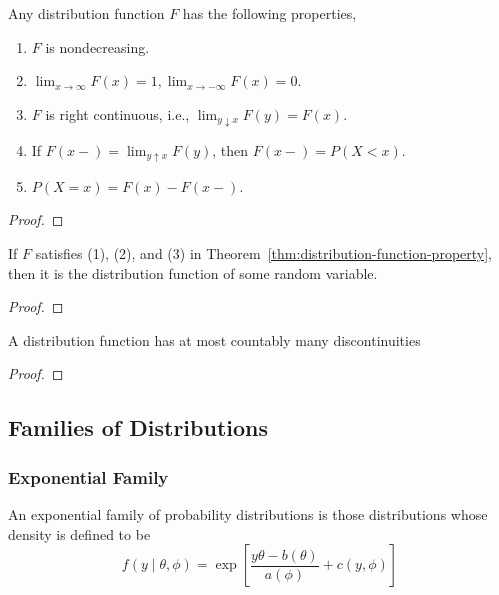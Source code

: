 \begin{theorem} \label{thm:distribution-function-property}
	Any distribution function $F$ has the following properties,
	\begin{enumerate}
		\item $F$ is nondecreasing.
		\item $\lim_{x\rightarrow\infty}F(x)=1,\lim_{x \rightarrow-\infty}F(x)=0$.
		\item $F$ is right continuous, i.e., $\lim_{y \downarrow x} F(y)=F(x)$.
		\item If $F(x-)=\lim_{y\uparrow x}F(y)$, then $F(x-)=P(X<x)$.
		\item $P(X=x)=F(x)-F(x-)$.
	\end{enumerate}
\end{theorem}

\begin{proof}

\end{proof}

\begin{theorem}
	If $F$ satisfies (1), (2), and (3) in Theorem~\ref{thm:distribution-function-property}, then it is the distribution function of some random variable.
\end{theorem}

\begin{proof}

\end{proof}

\begin{theorem}
	A distribution function has at most countably many discontinuities
\end{theorem}

\begin{proof}

\end{proof}

\subsection{Families of Distributions}

\subsubsection{Exponential Family}

\begin{definition} \label{def:exponential-family}
	An exponential family of probability distributions is those distributions whose density is defined to be
	\begin{equation}
		f\left(y\mid\theta,\phi\right)=\exp\left[\frac{y\theta-b(\theta)}{a(\phi)}+c(y,\phi)\right]
	\end{equation}
\end{definition}

